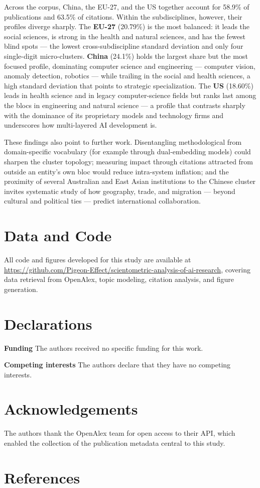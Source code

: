 \documentclass{article}
\begin{document}
	Across the corpus, China, the EU-27, and the US together account for 58.9\% of publications and 63.5\% of citations. Within the subdisciplines, however, their profiles diverge sharply. The \textbf{EU-27} (20.79\%) is the most balanced: it leads the social sciences, is strong in the health and natural sciences, and has the fewest blind spots --- the lowest cross-subdiscipline standard deviation and only four single-digit micro-clusters. \textbf{China} (24.1\%) holds the largest share but the most focused profile, dominating computer science and engineering --- computer vision, anomaly detection, robotics --- while trailing in the social and health sciences, a high standard deviation that points to strategic specialization. The \textbf{US} (18.60\%) leads in health science and in legacy computer-science fields but ranks last among the blocs in engineering and natural science --- a profile that contrasts sharply with the dominance of its proprietary models and technology firms and underscores how multi-layered AI development is.
	
	These findings also point to further work. Disentangling methodological from domain-specific vocabulary (for example through dual-embedding models) could sharpen the cluster topology; measuring impact through citations attracted from outside an entity's own bloc would reduce intra-system inflation; and the proximity of several Australian and East Asian institutions to the Chinese cluster invites systematic study of how geography, trade, and migration --- beyond cultural and political ties --- predict international collaboration.
	
	\section*{Data and Code}
	
	All code and figures developed for this study are available at \url{https://github.com/Pigeon-Effect/scientometric-analysis-of-ai-research}, covering data retrieval from OpenAlex, topic modeling, citation analysis, and figure generation.
	
	\section*{Declarations}
	
	\textbf{Funding} The authors received no specific funding for this work.
	
	\textbf{Competing interests} The authors declare that they have no competing interests.
	
	
	\section*{Acknowledgements}
	
	The authors thank the OpenAlex team for open access to their API, which enabled the collection of the publication metadata central to this study.
	
	\section*{References}
	
	\printbibliography[heading=none]
	
\end{document}
